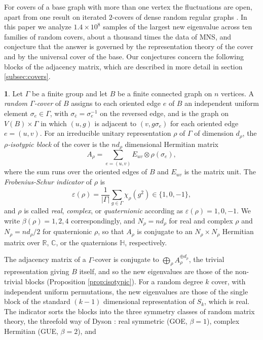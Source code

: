 \documentclass[12pt,oneside,english]{amsart}
\numberwithin{equation}{section}
\numberwithin{figure}{section}
\numberwithin{table}{section}
\theoremstyle{plain}
\numberwithin{thm}{section}
\theoremstyle{plain}
\theoremstyle{plain}
\theoremstyle{plain}
\theoremstyle{definition}
\newtheorem{defn}[thm]{\protect\definitionname}
\theoremstyle{definition}
\theoremstyle{definition}
\theoremstyle{remark}
\providecommand{\definitionname}{Definition}
\begin{document}
For covers of a base graph with more than one vertex the fluctuations
are open, apart from one result on iterated $2$-covers of dense random
regular graphs \cite{LiuZou2025}. In this paper we analyze $1.4\times10^{8}$
samples of the largest new eigenvalue across ten families of random
covers, about a thousand times the data of MNS, and conjecture that
the answer is governed by the representation theory of the cover and
by the universal cover of the base. Our conjectures concern the following
blocks of the adjacency matrix, which are described in more detail
in section \ref{subsec:covers}.
\begin{defn}
\label{def:blocks}Let $\Gamma$ be a finite group and let $B$ be
a finite connected graph on $n$ vertices. A \emph{random $\Gamma$-cover}
of $B$ assigns to each oriented edge $e$ of $B$ an independent uniform
element $\sigma_{e}\in\Gamma$, with $\sigma_{\bar{e}}=\sigma_{e}^{-1}$
on the reversed edge, and is the graph on $V(B)\times\Gamma$ in which
$(u,g)$ is adjacent to $(v,g\sigma_{e})$ for each oriented edge $e=(u,v)$.
For an irreducible unitary representation $\rho$
of $\Gamma$ of dimension $d_{\rho}$, the \emph{$\rho$-isotypic block}
of the cover is the $nd_{\rho}$ dimensional Hermitian matrix
\[
A_{\rho}=\sum_{e=(u,v)}E_{uv}\otimes\rho(\sigma_{e}),
\]
where the sum runs over the oriented edges of $B$ and $E_{uv}$ is
the matrix unit. The \emph{Frobenius-Schur indicator} of $\rho$ is
\[
\varepsilon(\rho)=\frac{1}{|\Gamma|}\sum_{g\in\Gamma}\chi_{\rho}(g^{2})\in\{1,0,-1\},
\]
and $\rho$ is called \emph{real}, \emph{complex}, or \emph{quaternionic}
according as $\varepsilon(\rho)=1,0,-1$. We write $\beta(\rho)=1,2,4$
correspondingly, and $N_{\rho}=nd_{\rho}$ for real and complex $\rho$
and $N_{\rho}=nd_{\rho}/2$ for quaternionic $\rho$, so that $A_{\rho}$
is conjugate to an $N_{\rho}\times N_{\rho}$ Hermitian matrix over
$\mathbb{R}$, $\mathbb{C}$, or the quaternions $\mathbb{H}$, respectively.
\end{defn}
The adjacency matrix of a $\Gamma$-cover is conjugate to $\bigoplus_{\rho}A_{\rho}^{\oplus d_{\rho}}$,
the trivial representation giving $B$ itself, and so the new eigenvalues
are those of the non-trivial blocks (Proposition \ref{prop:isotypic}).
For a random degree $k$ cover, with independent uniform permutations,
the new eigenvalues are those of the single block of the standard
$(k-1)$ dimensional representation of $S_{k}$, which is real. The
indicator sorts the blocks into the three symmetry classes of random
matrix theory, the threefold way of Dyson \cite{Dyson1962}: real
symmetric (GOE, $\beta=1$), complex Hermitian (GUE, $\beta=2$), and
\end{document}
